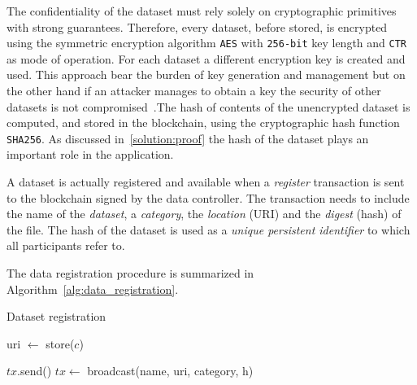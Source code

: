 The confidentiality of the dataset must rely solely on cryptographic primitives with strong guarantees. Therefore, every dataset, before stored, is encrypted using the symmetric encryption algorithm \verb|AES| with \verb|256-bit| key length and \verb|CTR| as mode of operation. For each dataset a different encryption key is created and used. This approach bear the burden of key generation and management but on the other hand if an attacker manages to obtain a key the security of other datasets is not compromised~\cite{schneier1997improved}.The hash of contents of the unencrypted dataset is computed, and stored in the blockchain, using the cryptographic hash function \verb|SHA256|. As discussed in~\ref{solution:proof} the hash of the dataset plays an important role in the application.

A dataset is actually registered and available when a \textit{register} transaction is sent to the blockchain signed by the data controller. The transaction needs to include the name of the \textit{dataset}, a \textit{category}, the \textit{location} (URI) and the \textit{digest} (hash) of the file. The hash of the dataset is used as a \textit{unique persistent identifier} to which all participants refer to.

The data registration procedure is summarized in Algorithm~\ref{alg:data_registration}.

\begin{algorithm}[!htb]
  \caption{Dataset registration}\label{alg:data_registration}
  \begin{algorithmic}[1]
       
       
       
      \State uri $\leftarrow$ store($c$) 
      \State {}
  \EndFunction

         
         
        \State $tx$.send() 
        \State {}
  \EndFunction
     
    \State $tx \leftarrow$ broadcast(name, uri, category, h) 
    \State {}
  \EndProcedure
  \end{algorithmic}
\end{algorithm}

